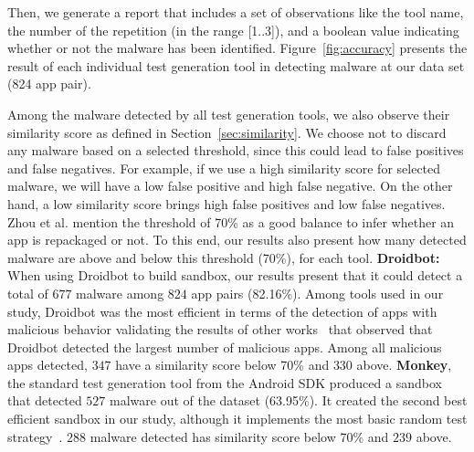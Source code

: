 Then, we generate a report that includes a set of observations like the tool name, the number of the repetition (in the range [1..3]), and a boolean value indicating whether or not the malware has been identified. Figure~\ref{fig:accuracy} presents the result of each individual test generation tool in detecting malware at our data set (824 app pair).

Among the malware detected by all test generation tools, we also observe their similarity score as defined in Section~\ref{sec:similarity}. We choose  not to discard any malware based on a selected threshold, since this could lead to false positives and false negatives. For example, if we use a high similarity score for selected malware, we will have a low false positive and high false negative. On the other hand, a low similarity score brings high false positives and low false negatives. Zhou et al.\cite{DBLP:conf/codaspy/ZhouZJN12} mention the threshold of 70\% as a good balance to infer whether an app is repackaged or not. To this end, our results also present how many detected malware are above and below this threshold (70\%), for each tool.\newline
\newline
\textbf{Droidbot:} When using Droidbot to build sandbox, our results present that it could detect a total of $677$ malware among $824$ app pairs (82.16\%). Among tools used in our study, Droidbot was the most efficient in terms of the detection of apps with malicious behavior validating the results of other works~\cite{DBLP:conf/wcre/BaoLL18}\cite{DBLP:journals/jss/CostaMMSSBNR22} that observed that Droidbot detected the largest number of malicious apps. Among all malicious apps detected, $347$ have a similarity score below 70\% and $330$ above.\newline
\newline
\textbf{Monkey}, the standard test generation tool from the Android SDK  produced a sandbox that detected $527$ malware out of the dataset (63.95\%). It created the second best efficient sandbox in our study, although it implements the most basic random test strategy~\cite{DBLP:conf/icst/WetzlmaierRP16}\cite{DBLP:conf/kbse/ChoudharyGO15}. $288$ malware detected has similarity score below 70\% and $239$ above.   \newline
